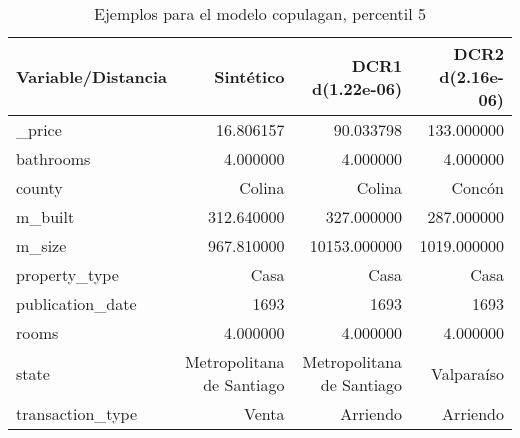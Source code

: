 \begin{table}[H]
\centering
\fontsize{10}{14}\selectfont
\caption{Ejemplos para el modelo copulagan, percentil 5}
\label{table-example-economicos-a-2-copulagan-5p}
\begin{tabular}{|l|r|r|r|}
\hline
\rowcolor[gray]{0.8}
Variable/Distancia & Sintético & DCR1 d(1.22e-06) & DCR2 d(2.16e-06) \\
\hline \_price & \cellcolor[rgb]{0.9, 0.54, 0.52} 16.806157 & 90.033798 & 133.000000 \\
\hline bathrooms & \cellcolor[rgb]{0.9, 0.54, 0.52} 4.000000 & \cellcolor[rgb]{0.9, 0.54, 0.52} 4.000000 & \cellcolor[rgb]{0.9, 0.54, 0.52} 4.000000 \\
\hline county & \cellcolor[rgb]{0.9, 0.54, 0.52} Colina & \cellcolor[rgb]{0.9, 0.54, 0.52} Colina & Concón \\
\hline m\_built & \cellcolor[rgb]{0.9, 0.54, 0.52} 312.640000 & 327.000000 & 287.000000 \\
\hline m\_size & \cellcolor[rgb]{0.9, 0.54, 0.52} 967.810000 & 10153.000000 & 1019.000000 \\
\hline property\_type & \cellcolor[rgb]{0.9, 0.54, 0.52} Casa & \cellcolor[rgb]{0.9, 0.54, 0.52} Casa & \cellcolor[rgb]{0.9, 0.54, 0.52} Casa \\
\hline publication\_date & \cellcolor[rgb]{0.9, 0.54, 0.52} 1693 & \cellcolor[rgb]{0.9, 0.54, 0.52} 1693 & \cellcolor[rgb]{0.9, 0.54, 0.52} 1693 \\
\hline rooms & \cellcolor[rgb]{0.9, 0.54, 0.52} 4.000000 & \cellcolor[rgb]{0.9, 0.54, 0.52} 4.000000 & \cellcolor[rgb]{0.9, 0.54, 0.52} 4.000000 \\
\hline state & \cellcolor[rgb]{0.9, 0.54, 0.52} Metropolitana de Santiago & \cellcolor[rgb]{0.9, 0.54, 0.52} Metropolitana de Santiago & Valparaíso \\
\hline transaction\_type & \cellcolor[rgb]{0.9, 0.54, 0.52} Venta & Arriendo & Arriendo \\
\hline
\end{tabular}
\end{table}
